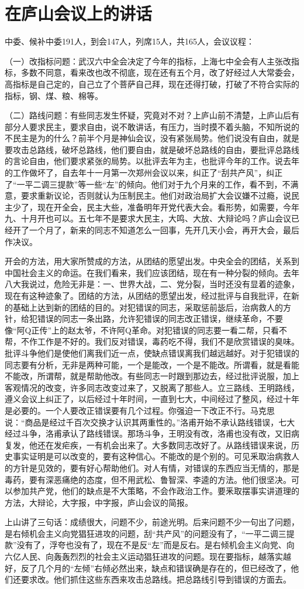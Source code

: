 \section[在庐山会议上的讲话（一九五九年八月二日）]{在庐山会议上的讲话}


中委、候补中委191人，到会147人，列席15人，共165人，会议议程：

（一）改指标问题：武汉六中全会决定了今年的指标，上海七中全会有人主张改指标，多数不同意，看来改也改不彻底，现在还有五个月，改了好经过人大常委会，高指标是自己定的，自己立了个菩萨自己拜，现在还得打破，打破了不符合实际的指标，钢、煤、粮、棉等。

（二）路线问题：有些同志发生怀疑，究竟对不对？上庐山前不清楚，上庐山后有部分人要求民主，要求自由，说不敢讲话，有压力，当时摸不着头脑，不知所说的不民主是为的什么？前半个月是神仙会议，没有紧张局势。他们说没有自由，就是要攻击总路线，破坏总路线，他们要自由，就是破坏总路线的自由，要批评总路线的言论自由，他们要求紧张的局势。以批评去年为主，也批评今年的工作。说去年的工作做坏了，自去年十一月第一次郑州会议以来，纠正了“刮共产风”，纠正了“一平二调三提款”等一些“左”的倾向。他们对于九个月来的工作，看不到，不满意，要求重新议论，否则就认为压制民主。他们对政治局扩大会议嫌不过瘾，说民主少了，现在开全会，民主大些，准备明年开党代表大会。看形势，如需要，今年九、十月开也可以。五七年不是要求大民主，大鸣、大放、大辩论吗？庐山会议已经开了一个月了，新来的同志不知道怎么一回事，先开几天小会，再开大会，最后作决议。

开会的方法，用大家所赞成的方法，从团结的愿望出发。中央全会的团结，关系到中国社会主义的命运。在我们看来，我们应该团结，现在有一种分裂的倾向。去年八大我说过，危险无非是：一、世界大战，二、党分裂，当时还没有显着的迹象，现在有这种迹象了。团结的方法，从团结的愿望出发，经过批评与自我批评，在新的基础上达到新的团结的目的。对犯错误的同志，采取惩前毖后，治病救人的方针，给犯错误的同志一条出路，允许犯错误的同志改正错误，继续革命，不要像“阿Q正传”上的赵太爷，不许阿Q革命。对犯错误的同志要一看二帮，只看不帮，不作工作是不好的。我们反对错误，毒药吃不得，我们不是欣赏错误的臭味。批评斗争他们是使他们离我们近一点，使缺点错误离我们越远越好。对于犯错误的同志要有分析，无非是两种可能，一个是能改，一个是不能改。所谓看，就是看能不能改，所谓帮，就是帮助他改。有些同志一时跟到那边去，经过批评说服，加上客观情况的改变，许多同志改变过来了，又脱离了那些人。立三路线、王明路线，遵义会议上纠正了，以后经过十年时间，一直到七大，中间经过了整风，经过十年是必要的。一个人要改正错误要有几个过程。你强迫一下改正不行。马克思说：“商品是经过千百次交换才认识其两重性的。”洛甫开始不承认路线错误，七大经过斗争，洛甫承认了路线错误。那场斗争，王明没有改，洛甫也没有改，又旧病复发，他还在发疟疾，一有机会出来了。大多数同志改好了。从路线错误来说，历史事实证明是可以改变的，要有这种信心。不能改的是个别的。可见釆取治病救人的方针是见效的，要有好心帮助他们。对人有情，对错误的东西应当无情的，那是毒药，要有深恶痛绝的态度，但不用武松、鲁智深、李逵的方法。他们很坚决。可以参加共产党，他们的缺点是不大策略，不会作政治工作。要釆取摆事实讲道理的方法，大辩论，大字报，中字报，庐山会议的简报。

上山讲了三句话：成绩很大，问题不少，前途光明。后来问题不少一句出了问题，是右倾机会主义向党猖狂进攻的问题，刮“共产风”的问题没有了，“一平二调三提款”没有了，浮夸也没有了，现在不是反“左”而是反右。是右倾机会主义向党、向六亿人民、向轰轰烈烈的社会主义运动猖狂进攻的问题。现在要指标，越落实越好，反了几个月的“左倾”右倾必然出来，缺点和错误确是存在的，但已经改了，他们还要求改。他们抓住这些东西来攻击总路线。把总路线引导到错误的方面去。


